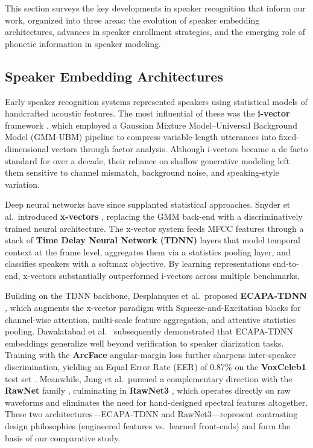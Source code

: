 This section surveys the key developments in speaker recognition that inform our work, organized into three areas: the evolution of speaker embedding architectures, advances in speaker enrollment strategies, and the emerging role of phonetic information in speaker modeling.

\subsection{Speaker Embedding Architectures}

Early speaker recognition systems represented speakers using statistical models of handcrafted acoustic features. The most influential of these was the \textbf{i-vector} framework \cite{dehak2010ivector}, which employed a Gaussian Mixture Model--Universal Background Model (GMM-UBM) pipeline to compress variable-length utterances into fixed-dimensional vectors through factor analysis. Although i-vectors became a de facto standard for over a decade, their reliance on shallow generative modeling left them sensitive to channel mismatch, background noise, and speaking-style variation.

Deep neural networks have since supplanted statistical approaches. Snyder et al.\ introduced \textbf{x-vectors} \cite{snyder2018xvectors}, replacing the GMM back-end with a discriminatively trained neural architecture. The x-vector system feeds MFCC features through a stack of \textbf{Time Delay Neural Network (TDNN)} layers \cite{peddinti2015tdnn} that model temporal context at the frame level, aggregates them via a statistics pooling layer, and classifies speakers with a softmax objective. By learning representations end-to-end, x-vectors substantially outperformed i-vectors across multiple benchmarks.

Building on the TDNN backbone, Desplanques et al.\ proposed \textbf{ECAPA-TDNN} \cite{ecapa-tdnn}, which augments the x-vector paradigm with Squeeze-and-Excitation blocks for channel-wise attention, multi-scale feature aggregation, and attentive statistics pooling. Dawalatabad et al.\ \cite{dawalatabad2021ecapa} subsequently demonstrated that ECAPA-TDNN embeddings generalize well beyond verification to speaker diarization tasks. Training with the \textbf{ArcFace} angular-margin loss \cite{deng2019arcface} further sharpens inter-speaker discrimination, yielding an Equal Error Rate (EER) of 0.87\% on the \textbf{VoxCeleb1} test set \cite{nagrani2017voxceleb}. Meanwhile, Jung et al.\ pursued a complementary direction with the \textbf{RawNet} family \cite{rawnet,rawnet2}, culminating in \textbf{RawNet3} \cite{rawnet3}, which operates directly on raw waveforms and eliminates the need for hand-designed spectral features altogether. These two architectures---ECAPA-TDNN and RawNet3---represent contrasting design philosophies (engineered features vs.\ learned front-ends) and form the basis of our comparative study.

